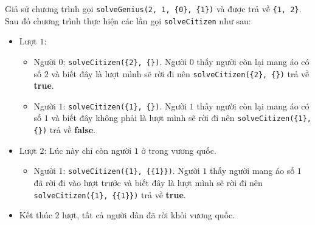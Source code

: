 Giả sử chương trình gọi \texttt{solveGenius(2, 1, \{0\}, \{1\})} và được trả về \texttt{\{1, 2\}}. Sau đó chương trình thực hiện các lần gọi \texttt{solveCitizen} như sau:

\begin{itemize}
\item Lượt $1$: 
    \begin{itemize}
    \item Người $0$: \texttt{solveCitizen(\{2\}, \{\})}. Người $0$ thấy người còn lại mang áo có số $2$ và biết đây là lượt mình sẽ rời đi nên \texttt{solveCitizen(\{2\}, \{\})} trả về \textbf{true}. 
    \item Người $1$: \texttt{solveCitizen(\{1\}, \{\})}. Người $1$ thấy người còn lại mang áo có số $1$ và biết đây không phải là lượt mình sẽ rời đi nên \texttt{solveCitizen(\{1\}, \{\})} trả về \textbf{false}. 
    \end{itemize}
\item Lượt $2$: Lúc này chỉ còn người $1$ ở trong vương quốc.
    \begin{itemize}
    \item Người $1$: \texttt{solveCitizen(\{1\}, \{\{1\}\})}. Người $1$ thấy người mang áo số $1$ đã rời đi vào lượt trước và biết đây là lượt mình sẽ rời đi nên \texttt{solveCitizen(\{1\}, \{\{1\}\})} trả về \textbf{true}. 
    \end{itemize}
\item Kết thúc $2$ lượt, tất cả người dân đã rời khỏi vương quốc.
\end{itemize}